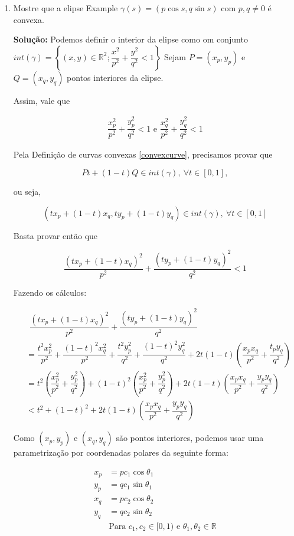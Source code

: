 \documentclass[12pt,letterpaper]{article}
\newcommand{\real}{\mathbb{R}}
\newcommand{\rr}{\mathbb{R}^2}
\begin{document}
	\begin{enumerate}[3.3.1]
		\item Mostre que a elipse Example $\gamma(s)=(p\cos s,q\sin s)$ com  $p,q\neq0$ é convexa.
		
		
		\textbf{Solução:} Podemos definir o interior da elipse como om conjunto $int(\gamma)=\left\{(x,y)\in\rr;\dfrac{x^2}{p^2}+\dfrac{y^2}{q^2}<1\right\}$
		Sejam $P=(x_p,y_p)$ e $Q=(x_q,y_q)$ pontos interiores da elipse. 
		
		Assim, vale que 
		
		\begin{align*}
			\dfrac{x_p^2}{p^2}+\dfrac{y_p^2}{q^2}<1\text{ e }\dfrac{x_q^2}{p^2}+\dfrac{y_q^2}{q^2}<1
		\end{align*}
	
	Pela Definição de curvas convexas \ref{convexcurve}, precisamos provar que 
	
	$$Pt+(1-t)Q\in int(\gamma),~\forall t\in[0,1],$$
	
	ou seja,
	
	$$(tx_p+(1-t)x_q,ty_p+(1-t)y_q)\in int(\gamma),~\forall t\in[0,1]$$
	
	Basta provar então que 
	
	$$\dfrac{(tx_p+(1-t)x_q)^2}{p^2}+\dfrac{(ty_p+(1-t)y_q)^2}{q^2}<1$$
	
	Fazendo os cálculos:
	
	\begin{align}
		&~~\dfrac{(tx_p+(1-t)x_q)^2}{p^2}+\dfrac{(ty_p+(1-t)y_q)^2}{q^2}\nonumber\\
		&=\dfrac{t^2x_p^2}{p^2}+\dfrac{(1-t)^2x_q^2}{p^2}+\dfrac{t^2y_p^2}{q^2}+\dfrac{(1-t)^2y_q^2}{q^2}+2t(1-t)\left(\dfrac{x_px_q}{p^2}+\dfrac{t_py_q}{q^2}\right)\nonumber\\
		&=t^2\left(\dfrac{x_p^2}{p^2}+\dfrac{y_p^2}{q^2}\right)+(1-t)^2\left(\dfrac{x_p^2}{p^2}+\dfrac{y_p^2}{q^2}\right)+2t(1-t)\left(\dfrac{x_px_q}{p^2}+\dfrac{y_py_q}{q^2}\right)\nonumber\\
		&< t^2+(1-t)^2+2t(1-t)\left(\dfrac{x_px_q}{p^2}+\dfrac{y_py_q}{q^2}\right)\label{ineq}
	\end{align}

	Como $(x_p,y_p)$ e $(x_q,y_q)$ são pontos interiores, podemos usar uma parametrização por coordenadas polares da seguinte forma:
	
	\begin{align*}
		x_p&=pc_1\cos\theta_1\\
		y_p&=qc_1\sin\theta_1\\
		x_q&=pc_2\cos\theta_2\\
		y_q&=qc_2\sin\theta_2\\
		&\text{Para $c_1,c_2\in [0,1)$ e $\theta_1,\theta_2\in\real$}
	\end{align*}


\end{enumerate}
\end{document}
